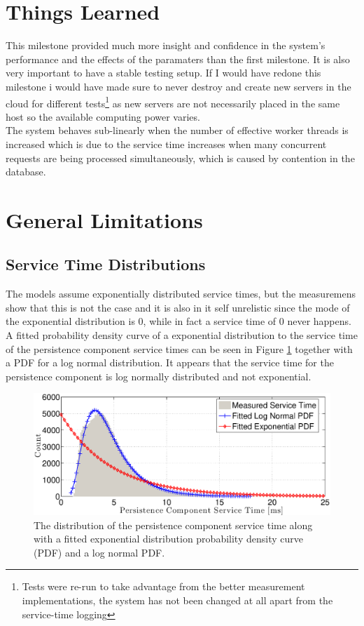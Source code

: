 \documentclass[a4paper, 11pt]{article}
\begin{document}
\section{Things Learned}
This milestone provided much more insight and confidence in the system's performance and the effects of the paramaters than the first milestone. It is also very important to have a stable testing setup. If I would have redone this milestone i would have made sure to never destroy and create new servers in the cloud for different tests\footnote{Tests were re-run to take advantage from the better measurement implementations, the system has not been changed at all apart from the service-time logging} as new servers are not necessarily placed in the same host so the available computing power varies.\\

The system behaves sub-linearly when the number of effective worker threads is increased which is due to the service time increases when many concurrent requests are being processed simultaneously, which is caused by contention in the database.

\section{General Limitations}

\subsection{Service Time Distributions}
The models assume exponentially distributed service times, but the measuremens show that this is not the case and it is also in it self unrelistic since the mode of the exponential distribution is 0, while in fact a service time of 0 never happens. A fitted probability density curve of a exponential distribution to the service time of the persistence component service times can be seen in Figure \ref{fig:serviceTimeDbHistogram10Threads} together with a PDF for a log normal distribution. It appears that the service time for the persistence component is log normally distributed and not exponential.

	\FloatBarrier
	\begin{figure}[cht!]
		\centering
			\includegraphics[width=1\linewidth,keepaspectratio]{serviceTimeDbHistogram10Threads}
		\caption{The distribution of the persistence component service time along with a fitted exponential distribution probability density curve (PDF) and a log normal PDF.}
		\label{fig:serviceTimeDbHistogram10Threads}
	\end{figure}
	\FloatBarrier
\end{document}
